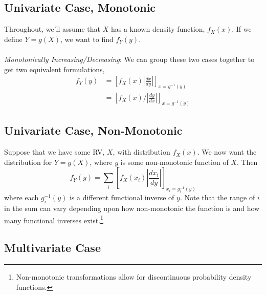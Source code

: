 \documentclass[a4paper,12pt]{scrartcl}
\begin{document}
\subsection{Univariate Case, Monotonic}

Throughout, we'll assume that $X$ has a known density function,
$f_X(x)$. If we define $Y = g(X)$, we want to find $f_Y(y)$.
\\
\\
{\sl Monotonically Increasing/Decreasing}: We can group these two
cases together to get two equivalent formulations,
\begin{align*}
   f_Y(y) &= \left[f_X(x) \left\lvert \frac{dx}{dy}\right\rvert
      \right]_{x = g^{-1}(y)} \\
      &= \left[ f_X(x) / \left\lvert \frac{dy}{dx}\right\rvert
      \right]_{x = g^{-1}(y)}
\end{align*}


\subsection{Univariate Case, Non-Monotonic}

Suppose that we have some RV, $X$, with distribution $f_X(x)$.
We now want the distribution for $Y=g(X)$, where $g$ is some
non-monotonic function of $X$. Then
\begin{equation}
   \label{nonmontrans}
   f_Y(y) = \sum_i \left[ f_X(x_i) \left\lvert \frac{dx_i}{dy}
      \right\rvert \right]_{x_i=g_i^{-1}(y)}
\end{equation}
where each $g_i^{-1}(y)$ is a different functional inverse of $y$.
Note that the range of $i$ in the sum can vary depending upon
how non-monotonic the function is and how many functional inverses
exist.\footnote{Non-monotonic transformations allow for discontinuous
probability density functions.}

\subsection{Multivariate Case}
\end{document}
